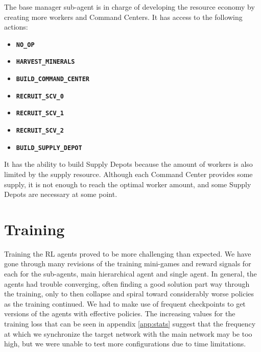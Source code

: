 The base manager sub-agent is in charge of developing the resource economy by creating more workers and Command Centers. It has access to the following actions:

\begin{multicols}{2}
\begin{itemize}
    \item \textbf{\texttt{NO\_OP}}
    \item \textbf{\texttt{HARVEST\_MINERALS}}
    \item \textbf{\texttt{BUILD\_COMMAND\_CENTER}}
    \item \textbf{\texttt{RECRUIT\_SCV\_0}}
    \item \textbf{\texttt{RECRUIT\_SCV\_1}}
    \item \textbf{\texttt{RECRUIT\_SCV\_2}}
    \item \textbf{\texttt{BUILD\_SUPPLY\_DEPOT}}
\end{itemize}
\end{multicols}

It has the ability to build Supply Depots because the amount of workers is also limited by the supply resource. Although each Command Center provides some supply, it is not enough to reach the optimal worker amount, and some Supply Depots are necessary at some point.

\section{Training}
\label{sec:training}

Training the RL agents proved to be more challenging than expected. We have gone through many revisions of the training mini-games and reward signals for each for the sub-agents, main hierarchical agent and single agent. In general, the agents had trouble converging, often finding a good solution part way through the training, only to then collapse and spiral toward considerably worse policies as the training continued. We had to make use of frequent checkpoints to get versions of the agents with effective policies. The increasing values for the training loss that can be seen in appendix \ref{app:stats} suggest that the frequency at which we synchronize the target network with the main network may be too high, but we were unable to test more configurations due to time limitations.

